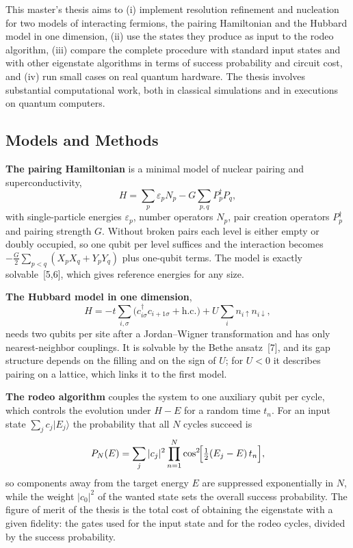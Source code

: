 \documentclass[12pt,a4paper]{article}
\begin{document}
This master's thesis aims to (i) implement resolution refinement and
nucleation for two models of interacting fermions, the pairing
Hamiltonian and the Hubbard model in one dimension, (ii) use the
states they produce as input to the rodeo algorithm, (iii) compare
the complete procedure with standard input states and with other
eigenstate algorithms in terms of success probability and circuit
cost, and (iv) run small cases on real quantum hardware.  The thesis
involves substantial computational work, both in classical
simulations and in executions on quantum computers.

\subsection*{Models and Methods}

\textbf{The pairing Hamiltonian} is a minimal model of nuclear
pairing and superconductivity,
\[
  H=\sum_{p}\varepsilon_p N_p-G\sum_{p,q}P_p^\dagger P_q ,
\]
with single-particle energies $\varepsilon_p$, number operators $N_p$,
pair creation operators $P_p^\dagger$ and pairing strength $G$.
Without broken pairs each level is either empty or doubly occupied,
so one qubit per level suffices and the interaction becomes
$-\tfrac{G}{2}\sum_{p<q}(X_pX_q+Y_pY_q)$ plus one-qubit terms.  The
model is exactly solvable~[5,6], which gives reference energies for
any size.

\textbf{The Hubbard model in one dimension},
\[
  H=-t\sum_{i,\sigma}\bigl(c^\dagger_{i\sigma}c_{i+1\sigma}+\mathrm{h.c.}\bigr)
  +U\sum_i n_{i\uparrow}n_{i\downarrow},
\]
needs two qubits per site after a Jordan--Wigner transformation and
has only nearest-neighbor couplings.  It is solvable by the Bethe
ansatz~[7], and its gap structure depends on the filling and on the
sign of $U$; for $U<0$ it describes pairing on a lattice, which links
it to the first model.

\textbf{The rodeo algorithm} couples the system to one auxiliary qubit
per cycle, which controls the evolution under $H-E$ for a random time
$t_n$.  For an input state $\sum_j c_j|E_j\rangle$ the probability
that all $N$ cycles succeed is
\[
  P_N(E)=\sum_j|c_j|^2\prod_{n=1}^{N}\cos^2\!\Bigl[\tfrac12(E_j-E)\,t_n\Bigr],
\]
so components away from the target energy $E$ are suppressed
exponentially in $N$, while the weight $|c_0|^2$ of the wanted state
sets the overall success probability.  The figure of merit of the
thesis is the total cost of obtaining the eigenstate with a given
fidelity: the gates used for the input state and for the rodeo
cycles, divided by the success probability.
\end{document}
